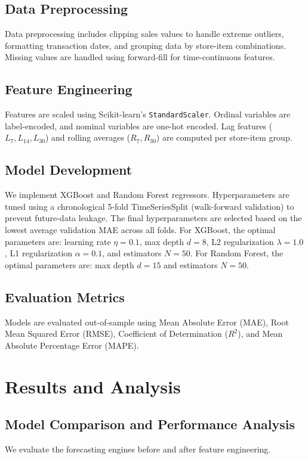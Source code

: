 \documentclass[conference]{IEEEtran}
\begin{document}
\subsection{Data Preprocessing}
Data preprocessing includes clipping sales values to handle extreme outliers, formatting transaction dates, and grouping data by store-item combinations. Missing values are handled using forward-fill for time-continuous features.

\subsection{Feature Engineering}
Features are scaled using Scikit-learn's \texttt{StandardScaler}. Ordinal variables are label-encoded, and nominal variables are one-hot encoded. Lag features ($L_7, L_{14}, L_{30}$) and rolling averages ($R_7, R_{30}$) are computed per store-item group.

\subsection{Model Development}
We implement XGBoost and Random Forest regressors. Hyperparameters are tuned using a chronological 5-fold TimeSeriesSplit (walk-forward validation) to prevent future-data leakage. The final hyperparameters are selected based on the lowest average validation MAE across all folds. For XGBoost, the optimal parameters are: learning rate $\eta = 0.1$, max depth $d = 8$, L2 regularization $\lambda = 1.0$, L1 regularization $\alpha = 0.1$, and estimators $N = 50$. For Random Forest, the optimal parameters are: max depth $d = 15$ and estimators $N = 50$.

\subsection{Evaluation Metrics}
Models are evaluated out-of-sample using Mean Absolute Error (MAE), Root Mean Squared Error (RMSE), Coefficient of Determination ($R^2$), and Mean Absolute Percentage Error (MAPE).

\section{Results and Analysis}

\subsection{Model Comparison and Performance Analysis}
We evaluate the forecasting engines before and after feature engineering.
\end{document}
